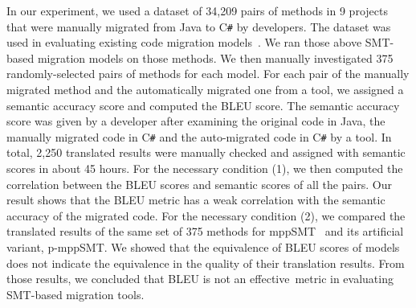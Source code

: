 %

In our experiment, we used a dataset of 34,209 pairs of methods in 9
projects that were manually migrated from Java to C\texttt{\#} by
developers. The dataset was used in evaluating existing code migration
models~\cite{ase15}. We ran those above SMT-based migration models on
those methods. We then manually investigated 375 randomly-selected
pairs of methods for each model. For each pair of the manually
migrated method and the automatically migrated one from a tool, we
assigned a semantic accuracy score and computed the BLEU score. The
semantic accuracy score was given by a developer after examining the
original code in Java, the manually migrated code in C\texttt{\#} and
the auto-migrated code in C\texttt{\#} by a tool. In total, 2,250
translated results were manually checked and assigned with semantic
scores in about 45 hours. For the necessary condition (1), we then
computed the correlation between the BLEU scores and semantic scores
of all the pairs.  Our result shows that the BLEU metric has a weak
correlation with the semantic accuracy of the migrated code. For the
necessary condition (2), we compared the translated results of the
same set of 375 methods for mppSMT~\cite{ase15} and its artificial
variant, p-mppSMT.
%
We showed that the equivalence of BLEU scores of models does not indicate
the equivalence in the quality of their translation results.
From those results, we concluded that BLEU is not an effective~metric
in evaluating 
SMT-based migration tools.

